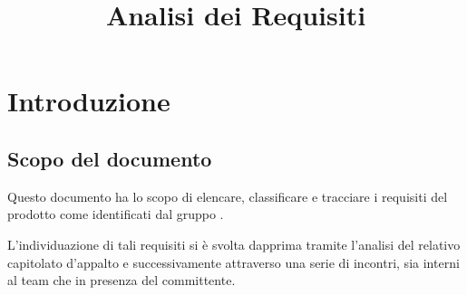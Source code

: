 


\author{\ALL}
\supervisor{\ALL}
\dest{\TV, \RC, \ZU}
\title{Analisi dei Requisiti}


\maketitle

\tableofcontents
\listoffigures

\newpage

\newcommand{\myimg}[1] {
	\begin{figure}[H]
		\makebox[\textwidth][c] {
			\texttt{[image: Diagrammi casi d'uso/\#1]}
		}
		\caption{#1}
		\label{#1}
	\end{figure}
}

\newcommand{\myimgsmall}[1] {
	\begin{figure}[H]
		\makebox[\textwidth][c] {
			\texttt{[image: Diagrammi casi d'uso/\#1]}
		}
		\caption{#1}
		\label{#1}
	\end{figure}
}

\newcommand{\myimgvsmall}[1] {
	\begin{figure}[H]
		\makebox[\textwidth][c] {
			\texttt{[image: Diagrammi casi d'uso/\#1]}
		}
		\caption{#1}
		\label{#1}
	\end{figure}
}






\section{Introduzione}

\subsection{Scopo del documento}
Questo documento ha lo scopo di elencare, classificare e tracciare i requisiti del prodotto \proj{} come identificati dal gruppo \hx{}.

L'individuazione di tali requisiti si è svolta dapprima tramite l'analisi del relativo capitolato d'appalto e successivamente attraverso una serie di incontri, sia interni al team che in presenza del committente.

